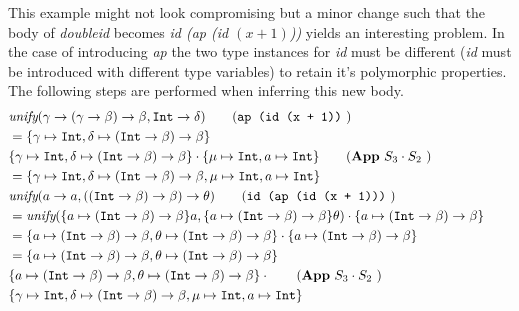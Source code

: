 \begin{exmp}
    This example might not look compromising but a minor change such that the body of \textit{doubleid} becomes \textit{id (ap (id $(x + 1)$))} yields an interesting problem.
    In the case of introducing \textit{ap} the two type instances for \textit{id} must be different (\textit{id} must be introduced with different type variables) to retain it's polymorphic properties.
    The following steps are performed when inferring this new body.
\begin{align}
    &\textit{unify}(\gamma \rightarrow (\gamma \rightarrow \beta) \rightarrow \beta, \texttt{Int} \rightarrow \delta) \tag{\texttt{ap (id (x + 1))} }\\
    & = \{ \gamma \mapsto \texttt{Int}, \delta \mapsto (\texttt{Int} \rightarrow \beta) \rightarrow \beta \} \tag*{}\\
    &\{ \gamma \mapsto \texttt{Int}, \delta \mapsto (\texttt{Int} \rightarrow \beta) \rightarrow \beta \} \cdot \{ \mu \mapsto \texttt{Int}, a \mapsto \texttt{Int} \} \tag{\textbf{App} $S_3 \cdot S_2$ }\\
    & = \{ \gamma \mapsto \texttt{Int}, \delta \mapsto (\texttt{Int} \rightarrow \beta) \rightarrow \beta, \mu \mapsto \texttt{Int}, a \mapsto \texttt{Int} \} \tag*{}\\
    &\textit{unify}(a \rightarrow a, ((\texttt{Int} \rightarrow \beta) \rightarrow \beta) \rightarrow \theta) \tag{\texttt{id (ap (id (x + 1)))} }\\
    &= \textit{unify}(
     \{ a \mapsto  (\texttt{Int} \rightarrow \beta) \rightarrow \beta \} a,
     \{ a \mapsto  (\texttt{Int} \rightarrow \beta) \rightarrow \beta\} \theta
    ) \cdot \{ a \mapsto  (\texttt{Int} \rightarrow \beta) \rightarrow \beta\} \tag*{}\\
    &= \{ a \mapsto (\texttt{Int} \rightarrow \beta) \rightarrow \beta, \theta \mapsto (\texttt{Int} \rightarrow \beta) \rightarrow \beta \} \cdot \{ a \mapsto (\texttt{Int} \rightarrow \beta) \rightarrow \beta\} \tag*{}\\
    &= \{ a \mapsto (\texttt{Int} \rightarrow \beta) \rightarrow \beta, \theta \mapsto (\texttt{Int} \rightarrow \beta) \rightarrow \beta \} \tag*{}\\
    &\{ a \mapsto (\texttt{Int} \rightarrow \beta) \rightarrow \beta, \theta \mapsto (\texttt{Int} \rightarrow \beta) \rightarrow \beta \} \cdot \tag{\textbf{App} $S_3 \cdot S_2$ }\\
    &\{ \gamma \mapsto \texttt{Int}, \delta \mapsto (\texttt{Int} \rightarrow \beta) \rightarrow \beta, \mu \mapsto \texttt{Int}, a \mapsto \texttt{Int} \} \tag*{}

\end{align}
\end{exmp}
